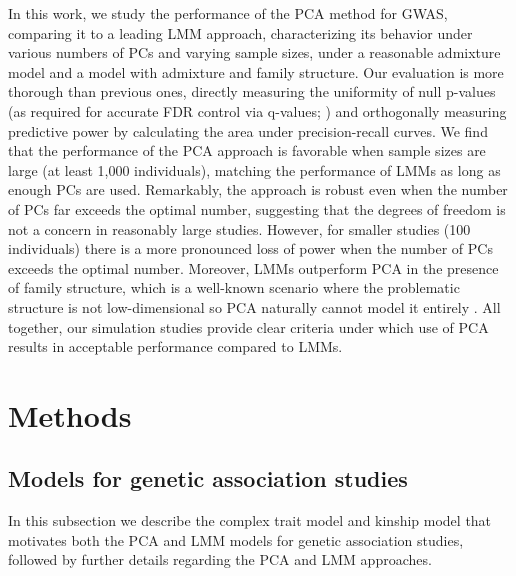 \documentclass[11pt]{article}
\begin{document}
In this work, we study the performance of the PCA method for GWAS, comparing it to a leading LMM approach, characterizing its behavior under various numbers of PCs and varying sample sizes, under a reasonable admixture model and a model with admixture and family structure.
Our evaluation is more thorough than previous ones, directly measuring the uniformity of null p-values (as required for accurate FDR control via q-values; \cite{storey_positive_2003, storey_statistical_2003}) and orthogonally measuring predictive power by calculating the area under precision-recall curves.
We find that the performance of the PCA approach is favorable when sample sizes are large (at least 1,000 individuals), matching the performance of LMMs as long as enough PCs are used.
Remarkably, the approach is robust even when the number of PCs far exceeds the optimal number, suggesting that the degrees of freedom is not a concern in reasonably large studies.
However, for smaller studies (100 individuals) there is a more pronounced loss of power when the number of PCs exceeds the optimal number.
Moreover, LMMs outperform PCA in the presence of family structure, which is a well-known scenario where the problematic structure is not low-dimensional so PCA naturally cannot model it entirely \citep{patterson_population_2006, price_new_2010}.
All together, our simulation studies provide clear criteria under which use of PCA results in acceptable performance compared to LMMs.


\section{Methods}

\subsection{Models for genetic association studies}

In this subsection we describe the complex trait model and kinship model that motivates both the PCA and LMM models for genetic association studies, followed by further details regarding the PCA and LMM approaches.
\end{document}

